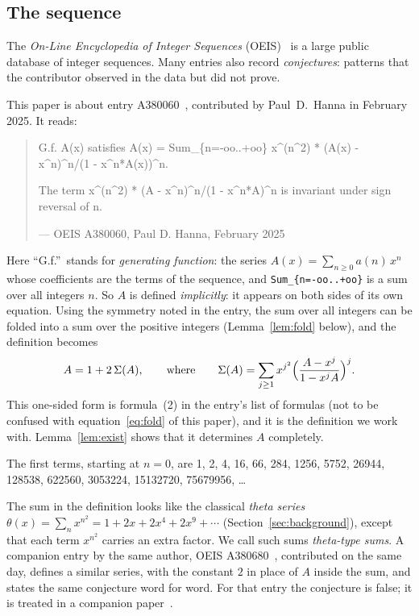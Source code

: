 \documentclass[11pt,a4paper]{article}
\theoremstyle{definition}
\theoremstyle{remark}
\begin{document}
\subsection{The sequence}\label{sec:sequence}
The \emph{On-Line Encyclopedia of Integer Sequences} (OEIS)~\cite{oeisdb} is a large public database of integer
sequences. Many
entries also record \emph{conjectures}: patterns that the contributor observed in the data but did not prove.

This paper is about entry A380060~\cite{oeis}, contributed by Paul~D.~Hanna in February 2025. It reads:
\begin{quote}\small\ttfamily\raggedright G.f. A(x) satisfies A(x) = Sum\_\{n=-oo..+oo\} x\^{}(n\^{}2) * (A(x) - x\^{}n)\^{}n/(1 - x\^{}n*A(x))\^{}n.\par\smallskip The term x\^{}(n\^{}2) * (A - x\^{}n)\^{}n/(1 - x\^{}n*A)\^{}n is invariant under sign reversal of n.\par\smallskip\hfill\textrm{--- OEIS A380060, Paul D. Hanna, February 2025}\end{quote}

Here ``G.f.''\ stands for \emph{generating function}: the series $A(x)=\sum_{n\ge0}a(n)\,x^n$ whose coefficients are
the terms of the sequence, and \texttt{Sum\_\{n=-oo..+oo\}} is a sum over all integers $n$. So $A$ is defined \emph{implicitly}: it appears on both sides of its own equation.
Using the symmetry noted in the entry, the sum over all integers can be folded into a sum over the positive integers
(Lemma~\ref{lem:fold} below), and the definition becomes
\begin{equation}\label{eq:def}
A=1+2\,\Sigma(A),\qquad\text{where}\qquad
\Sigma(A)=\sum_{j\ge1}x^{j^2}\Bigl(\frac{A-x^j}{1-x^jA}\Bigr)^{j}.
\end{equation}
This one-sided form is formula~(2) in the entry's list of formulas (not to be confused with equation~\eqref{eq:fold} of this
paper), and it is the definition we work with. Lemma~\ref{lem:exist} shows
that it determines $A$ completely.

The first terms, starting at $n=0$, are 1, 2, 4, 16, 66, 284, 1256, 5752, 26944, 128538, 622560, 3053224, 15132720, 75679956, \dots{}

The sum in the definition looks like the classical \emph{theta series} $\theta(x)=\sum_nx^{n^2}=1+2x+2x^4+2x^9+\cdots$
(Section~\ref{sec:background}), except that each term $x^{n^2}$ carries an extra factor. We call such sums
\emph{theta-type sums}. A companion entry by the same author, OEIS A380680~\cite{oeisother}, contributed on
the same day, defines a similar series, with the constant $2$ in place of $A$ inside the sum, and states the same
conjecture word for word. For that entry the conjecture is false; it is treated in a companion
paper~\cite{repo}.
\end{document}
